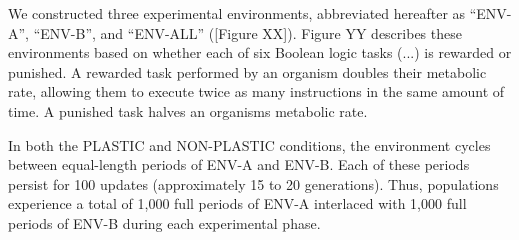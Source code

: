 
We constructed three experimental environments, abbreviated hereafter as ``ENV-A'', ``ENV-B'', and ``ENV-ALL'' ([Figure XX]).
Figure YY describes these environments based on whether each of six Boolean logic tasks (...) is rewarded or punished.
A rewarded task performed by an organism doubles their metabolic rate, allowing them to execute twice as many instructions in the same amount of time.
A punished task halves an organisms metabolic rate. 




In both the PLASTIC and NON-PLASTIC conditions, the environment cycles between equal-length periods of ENV-A and ENV-B.
Each of these periods persist for 100 updates (approximately 15 to 20 generations).
Thus, populations experience a total of 1,000 full periods of ENV-A interlaced with 1,000 full periods of ENV-B during each experimental phase.

